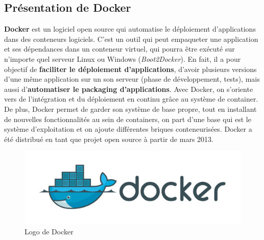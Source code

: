 \begin{onehalfspace}
\subsection{Présentation de Docker}
\textbf{Docker} est un logiciel open source qui automatise le déploiement d'applications dans des conteneurs logiciels. C'est un outil qui peut empaqueter une application et ses dépendances dans un conteneur virtuel, qui pourra être exécuté sur n'importe quel serveur Linux ou Windows (\emph{Boot2Docker}). En fait, il a pour objectif de \textbf{faciliter le déploiement d’applications}, d’avoir plusieurs versions d’une même application sur un son serveur (phase de développement, tests), mais aussi d’\textbf{automatiser le packaging d’applications}. Avec Docker, on s’oriente vers de l’intégration et du déploiement en continu grâce au système de container. De plus, Docker permet de garder son système de base propre, tout en installant de nouvelles fonctionnalités au sein de containers, on part d’une base qui est le système d’exploitation et on ajoute différentes briques conteneurisées. Docker a été distribué en tant que projet open source à partir de mars 2013.
\begin{figure}[H]
\centering
\includegraphics [scale=0.5]{chapitre2/assets/docker.png}
\caption{Logo de Docker}
\end{figure}


\end{onehalfspace}
